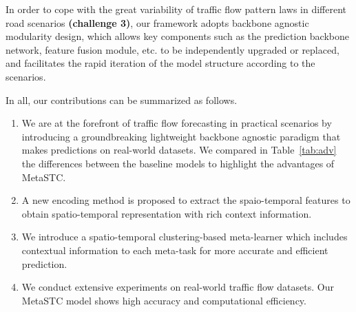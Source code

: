 \documentclass[lettersize,journal]{IEEEtran}
\begin{document}
In order to cope with the great variability of traffic flow pattern laws in different road scenarios \textbf{(challenge 3)}, our framework adopts backbone agnostic modularity design, which allows key components such as the prediction backbone network, feature fusion module, etc. to be independently upgraded or replaced, and facilitates the rapid iteration of the model structure according to the scenarios.

\color{black}
In all, our contributions can be summarized as follows.
		
\begin{enumerate}
\item  We are at the forefront of traffic flow forecasting in practical scenarios by introducing a groundbreaking lightweight backbone agnostic paradigm that makes predictions on real-world datasets. We compared in Table~\ref{tab:adv} the differences between the baseline models to highlight the advantages of MetaSTC.

\item A new encoding method is proposed to extract the spaio-temporal features to obtain spatio-temporal representation with rich context information.

\item We introduce a spatio-temporal clustering-based meta-learner which includes contextual information to each meta-task for more accurate and efficient prediction.

\item We conduct extensive experiments on real-world traffic flow datasets. Our MetaSTC model shows high accuracy and computational efficiency.

\end{enumerate} 
\end{document}
